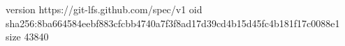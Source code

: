 version https://git-lfs.github.com/spec/v1
oid sha256:8ba664584eebf883cfcbb4740a7f3f8ad17d39cd4b15d45fc4b181f17c0088e1
size 43840

